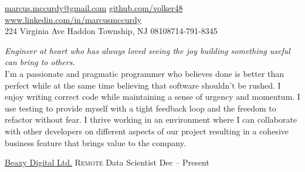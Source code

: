 \documentclass[10pt,a4paper]{article}
\begin{document}
\sloppy  %


\nobreakvspace{0.3em}  %

\noindent\href{mailto:marcus.mccurdy@gmail.com}
{marcus.mccurdy\mbox{}@\mbox{}gmail.com}\sbull
\href{http://github.com/volker48}{github.com/volker48} \sbull
\href{http://www.linkedin.com/in/marcusmccurdy}
    {www.linkedin.com/in/marcusmccurdy}
\\
224 Virginia Ave\sbull
Haddon Township, NJ 08108\sbull {}714-791-8345

\spacedhrule{0.9em}{-0.4em}  %


\vspace{-1.3em}  %
\begin{multicols}{2}  %
\noindent \emph{Engineer at heart who has always loved 
seeing the joy building something useful can bring to
others.}
\\

I'm a passionate and pragmatic programmer who believes done is better than 
perfect while at the same time believing that software shouldn't be rushed. 
I enjoy writing correct code while maintaining a sense of urgency and momentum. 
I use testing to provide myself with a tight feedback loop and the freedom to 
refactor without fear. I thrive working in an environment where I can  
collaborate with other developers on different aspects of our project resulting
in a cohesive business feature that brings value to the company.

\end{multicols}


\spacedhrule{0em}{-0.4em}


\headedsection
  {\href{https://beaxy.com/}{Beaxy Digital Ltd.}}
  {\textsc{Remote} } 
  {%
   \headedsubsection
  {Data Scientist}
  {Dec -- Present}
  {
  }
  }
\end{document}
